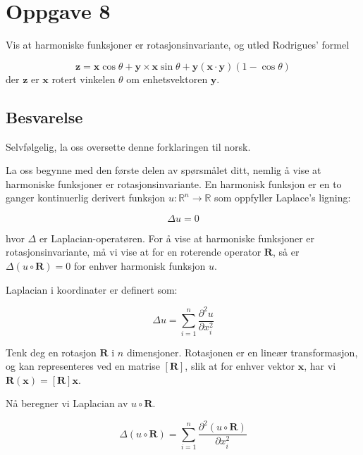 \section{Oppgave 8}
Vis at harmoniske funksjoner er rotasjonsinvariante, og utled Rodrigues' formel

\begin{equation*}
    \mathbf{z}=\mathbf{x} \cos \theta+\mathbf{y} \times \mathbf{x} \sin \theta+\mathbf{y}(\mathbf{x} \cdot \mathbf{y})(1-\cos \theta)
\end{equation*}
der $ \mathbf{z} $ er $ \mathbf{x} $ rotert vinkelen $ \theta $ om enhetsvektoren $ \mathbf{y} $.

\subsection*{Besvarelse}

Selvfølgelig, la oss oversette denne forklaringen til norsk.

La oss begynne med den første delen av spørsmålet ditt, nemlig å vise at harmoniske funksjoner er rotasjonsinvariante. En harmonisk funksjon er en to ganger kontinuerlig derivert funksjon $u : \mathbb{R}^n \rightarrow \mathbb{R}$ som oppfyller Laplace's ligning:

\begin{equation*}
\Delta u = 0
\end{equation*}

hvor $\Delta$ er Laplacian-operatøren. For å vise at harmoniske funksjoner er rotasjonsinvariante, må vi vise at for en roterende operator $\mathbf{R}$, så er $\Delta (u \circ \mathbf{R}) = 0$ for enhver harmonisk funksjon $u$.

Laplacian i koordinater er definert som:

\begin{equation*}
\Delta u = \sum_{i=1}^{n} \frac{\partial^2 u}{\partial x_i^2}
\end{equation*}

Tenk deg en rotasjon $\mathbf{R}$ i $n$ dimensjoner. Rotasjonen er en lineær transformasjon, og kan representeres ved en matrise $[\mathbf{R}]$, slik at for enhver vektor $\mathbf{x}$, har vi $\mathbf{R}(\mathbf{x}) = [\mathbf{R}]\mathbf{x}$. 

Nå beregner vi Laplacian av $u \circ \mathbf{R}$.

\begin{equation*}
\Delta (u \circ \mathbf{R}) = \sum_{i=1}^{n} \frac{\partial^2 (u \circ \mathbf{R})}{\partial x_i^2}
\end{equation*}

